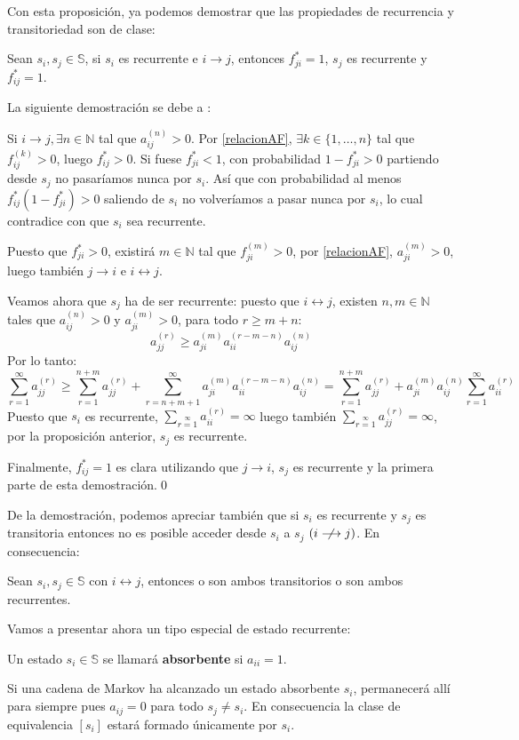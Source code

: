 Con esta proposición, ya podemos demostrar que las propiedades de recurrencia y transitoriedad son de clase:
\begin{theorem}\label{relacionEstadosRecurrentes}
    Sean $s_i, s_j\in\mathbb{S}$, si $s_i$ es recurrente e $i\longrightarrow j$, entonces $f_{ji}^*=1$, $s_j$ es recurrente y $f_{ij}^*=1$.
\end{theorem}
La siguiente demostración se debe a \cite[Página 38]{Ibarrola_1991}:
\begin{proofs*}
Si $i\longrightarrow j, \exists n\in\mathbb{N}$ tal que $a_{ij}^{(n)}>0$. Por \ref{relacionAF}, $\exists k\in\{1,\dots ,n\}$ tal que $f_{ij}^{(k)}>0$, luego $f_{ij}^*>0$. Si fuese $f_{ji}^*<1$, con probabilidad $1-f_{ji}^*>0$ partiendo desde $s_j$ no pasaríamos nunca por $s_i$. Así que con probabilidad al menos $f_{ij}^*(1-f_{ji}^*)>0$ saliendo de $s_i$ no volveríamos a pasar nunca por $s_i$, lo cual contradice con que $s_i$ sea recurrente.

Puesto que $f_{ji}^*>0$, existirá $m\in\mathbb{N}$ tal que $f_{ji}^{(m)}>0$, por \eqref{relacionAF}, $a_{ji}^{(m)}>0$, luego también $j\longrightarrow i$ e $i\longleftrightarrow j$.

Veamos ahora que $s_j$ ha de ser recurrente: puesto que $i\longleftrightarrow j$, existen $n,m \in\mathbb{N}$ tales que $a_{ij}^{(n)}>0$ y $a_{ji}^{(m)}>0$, para todo $r\geq m+n$:
\[a_{jj}^{(r)}\geq a_{ji}^{(m)}a_{ii}^{(r-m-n)}a_{ij}^{(n)}\]
Por lo tanto:
\[\sum_{r=1}^\infty a_{jj}^{(r)}\geq\sum_{r=1}^{n+m} a_{jj}^{(r)}+\sum_{r=n+m+1}^\infty a_{ji}^{(m)}a_{ii}^{(r-m-n)}a_{ij}^{(n)}=\sum_{r=1}^{n+m} a_{jj}^{(r)}+a_{ji}^{(m)}a_{ij}^{(n)}\sum_{r=1}^{\infty} a_{ii}^{(r)}\]
Puesto que $s_i$ es recurrente, $\sum\limits_{r=1}\limits^{\infty} a_{ii}^{(r)}=\infty$ luego también $\sum\limits_{r=1}\limits^{\infty} a_{jj}^{(r)}=\infty$, por la proposición anterior, $s_j$ es recurrente.

Finalmente, $f_{ij}^*=1$ es clara utilizando que $j\longrightarrow i$, $s_j$ es recurrente y la primera parte de esta demostración.\qed
\end{proofs*}

De la demostración, podemos apreciar también que si $s_i$ es recurrente y $s_j$ es transitoria entonces no es posible acceder desde $s_i$ a $s_j$  $(i\centernot\longrightarrow j)$. En consecuencia:

\begin{corollary}
    Sean $s_i, s_j\in\mathbb{S}$ con $i\longleftrightarrow j$, entonces o son ambos transitorios o son ambos recurrentes.
\end{corollary}
Vamos a presentar ahora un tipo especial de estado recurrente:
\begin{definition}
Un estado $s_i\in\mathbb{S}$ se llamará \textbf{absorbente} si $a_{ii}=1$.
\end{definition}
Si una cadena de Markov ha alcanzado un estado absorbente $s_i$, permanecerá allí para siempre pues $a_{ij}=0$ para todo $s_j\neq s_i$. En consecuencia la clase de equivalencia $[s_i]$ estará formado únicamente por $s_i$.

